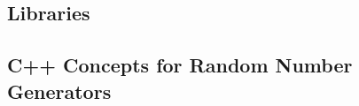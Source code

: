 \documentclass[crop=false]{standalone}
\begin{document}
    \subsection{Libraries} %
    \label{sub:libraries}


    \subsection{C++ Concepts for Random Number Generators} %
    \label{sub:c_concepts_for_random_number_generators}

\end{document}
